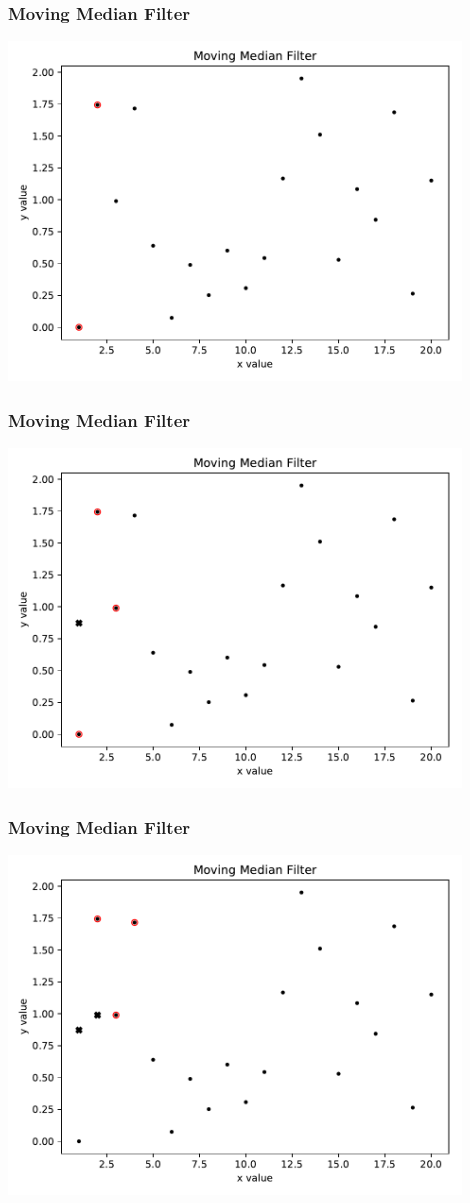 \documentclass[notes]{beamer}
\begin{document}
\begin{frame}
\frametitle{Moving Median Filter}
\centering
\includegraphics[width=0.9\textwidth]{../med_filt_dem_fig/med_filt_0.pdf}
\end{frame}

\begin{frame}
\frametitle{Moving Median Filter}
\centering
\includegraphics[width=0.9\textwidth]{../med_filt_dem_fig/med_filt_1.pdf}
\end{frame}

\begin{frame}
\frametitle{Moving Median Filter}
\centering
\includegraphics[width=0.9\textwidth]{../med_filt_dem_fig/med_filt_2.pdf}
\end{frame}
\end{document}
